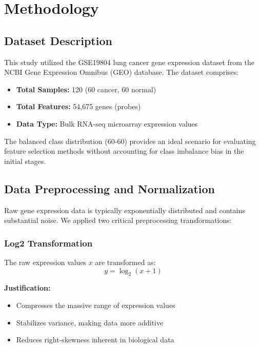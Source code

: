 \chapter{Methodology}

\section{Dataset Description}

This study utilized the GSE19804 lung cancer gene expression dataset from the NCBI Gene Expression Omnibus (GEO) database. The dataset comprises:
\begin{itemize}
    \item \textbf{Total Samples:} 120 (60 cancer, 60 normal)
    \item \textbf{Total Features:} 54,675 genes (probes)
    \item \textbf{Data Type:} Bulk RNA-seq microarray expression values
\end{itemize}

The balanced class distribution (60-60) provides an ideal scenario for evaluating feature selection methods without accounting for class imbalance bias in the initial stages.

\section{Data Preprocessing and Normalization}

Raw gene expression data is typically exponentially distributed and contains substantial noise. We applied two critical preprocessing transformations:

\subsection{Log2 Transformation}

The raw expression values $x$ are transformed as:
\begin{equation}
    y = \log_2(x + 1)
\end{equation}

\textbf{Justification:}
\begin{itemize}
    \item Compresses the massive range of expression values
    \item Stabilizes variance, making data more additive
    \item Reduces right-skewness inherent in biological data
\end{itemize}

